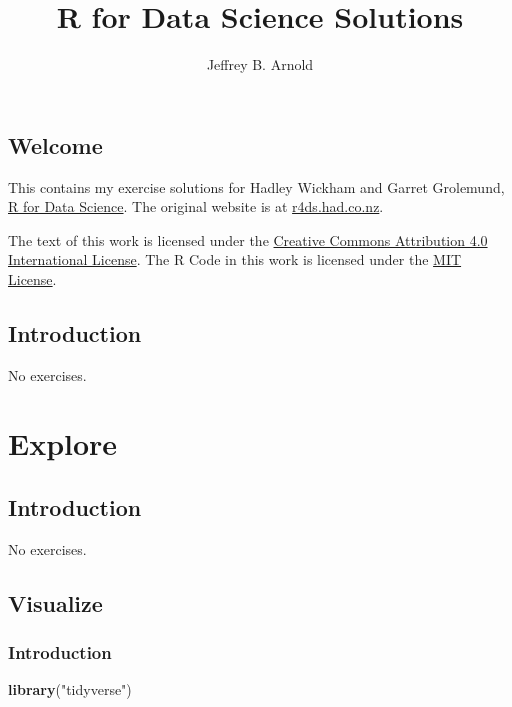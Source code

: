 \documentclass[]{book}
\title{R for Data Science Solutions}
\author{Jeffrey B. Arnold}
\date{}
\newenvironment{Shaded}{\begin{snugshade}}{\end{snugshade}}
\newcommand{\KeywordTok}[1]{\textcolor[rgb]{0.13,0.29,0.53}{\textbf{#1}}}
\newcommand{\NormalTok}[1]{#1}
\newcommand{\StringTok}[1]{\textcolor[rgb]{0.31,0.60,0.02}{#1}}
\theoremstyle{definition}
\theoremstyle{definition}
\theoremstyle{definition}
\theoremstyle{remark}
\begin{document}
\maketitle

{
\setcounter{tocdepth}{1}
\tableofcontents
}
\hypertarget{welcome}{%
\chapter*{Welcome}\label{welcome}}

This contains my exercise solutions for Hadley Wickham and Garret
Grolemund, \href{http://amzn.to/2aHLAQ1}{R for Data Science}. The
original website is at \href{http://r4ds.had.co.nz/}{r4ds.had.co.nz}.

The text of this work is licensed under the
\href{http://creativecommons.org/licenses/by/4.0/}{Creative Commons
Attribution 4.0 International License}. The R Code in this work is
licensed under the \href{https://opensource.org/licenses/MIT}{MIT
License}.

\hypertarget{introduction}{%
\chapter{Introduction}\label{introduction}}

No exercises.

\hypertarget{part-explore}{%
\part{Explore}\label{part-explore}}

\hypertarget{explore-intro}{%
\chapter{Introduction}\label{explore-intro}}

No exercises.

\hypertarget{visualize}{%
\chapter{Visualize}\label{visualize}}

\hypertarget{introduction-1}{%
\section{Introduction}\label{introduction-1}}

\begin{Shaded}
\begin{Highlighting}[]
\KeywordTok{library}\NormalTok{(}\StringTok{"tidyverse"}\NormalTok{)}
\end{Highlighting}
\end{Shaded}
\end{document}
